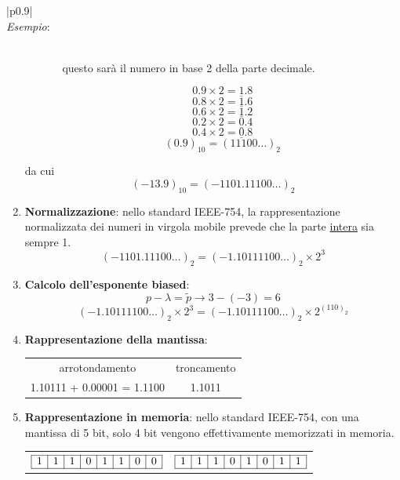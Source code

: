 \documentclass{article}
\numberwithin{equation}{section}
\newenvironment{example}
{\begin{center}
        \begin{tabular}{|p{0.9\textwidth}|}
            \hline \\ 
            \textit{Esempio}: \\\\ 
        }
        {
            \\\\ \hline
        \end{tabular}
    \end{center}
}
\begin{document}
\begin{example}
\begin{enumerate}
\begin{itemize}
\begin{enumerate}
                            questo sarà il numero in base 2 della parte
                            decimale.
                    \end{enumerate}
                    $$0.9\times2=\underline{1}.8$$
                    $$0.8\times2=\underline{1}.6$$
                    $$0.6\times2=\underline{1}.2$$
                    $$0.2\times2=\underline{0}.4$$
                    $$0.4\times2=\underline{0}.8$$
                    $$(0.9)_{10}=(11100\ldots)_2$$
            \end{itemize}
            da cui
            $$(-13.9)_{10}=(-1101.11100\ldots)_2$$
        \item \textbf{Normalizzazione}:
        nello standard IEEE-754, la rappresentazione normalizzata dei numeri
        in virgola mobile prevede che la parte \underline{intera} sia sempre
        1.
            $$(-1101.11100\ldots)_2=(-1.10111100\ldots)_2\times2^{3}$$
        \item \textbf{Calcolo dell'esponente biased}:
            $$p-\lambda=\tilde{p}\rightarrow3-(-3)=6$$
            $$(-1.10111100\ldots)_2\times2^3=(-1.10111100\ldots)_2\times2^{(110)_2}$$
        \item \textbf{Rappresentazione della mantissa}:
            \begin{center}
               \begin{tabular}{cc}
                    arrotondamento & troncamento \\ 
                   1.10111 + 0.00001 = 1.1100 & 1.1011
               \end{tabular} 
            \end{center}
        \item \textbf{Rappresentazione in memoria}: nello standard IEEE-754,
        con una mantissa di 5 bit, solo 4 bit vengono effettivamente memorizzati in memoria.
        \begin{center}
           \begin{tabular}{cc}
               $
               \begin{array}{|c|c|c|c|c|c|c|c|}
                   \hline
                   1 & 1 & 1 & 0 & 1 & 1 & 0 & 0\\
                   \hline
               \end{array} 
               $ 
                &
                $
                \begin{array}{|c|c|c|c|c|c|c|c|}
                    \hline
                    1 & 1 & 1 & 0 & 1 & 0 & 1 & 1 \\
                    \hline
                \end{array}
                $
           \end{tabular} 
        \end{center}
    \end{enumerate}
\end{example}
\end{document}
